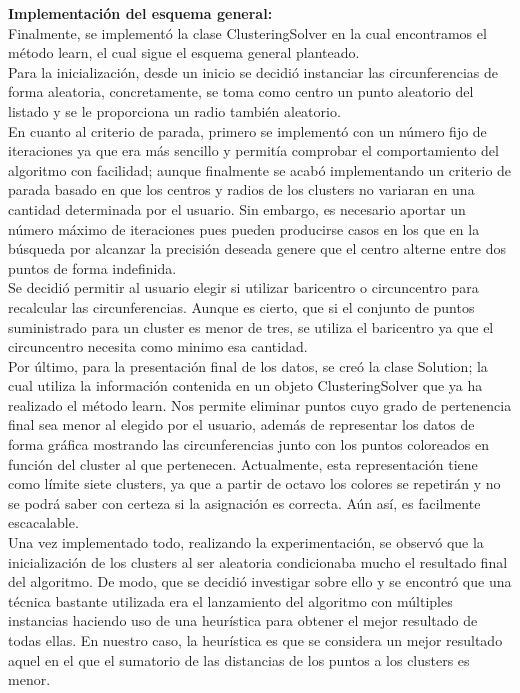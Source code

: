 \documentclass[conference,a4paper]{IEEEtran}
\begin{document}
\textbf{Implementación del esquema general:}\\

Finalmente, se implementó la clase ClusteringSolver en la cual encontramos el método learn, el cual sigue el esquema general planteado.\\
Para la inicialización, desde un inicio se decidió instanciar las circunferencias de forma aleatoria, concretamente, se toma como centro un punto aleatorio del listado y se le proporciona un radio también aleatorio.\\
En cuanto al criterio de parada, primero se implementó con un número fijo de iteraciones ya que era más sencillo y permitía comprobar el comportamiento del algoritmo con facilidad; aunque finalmente se acabó implementando un criterio de parada basado en que los centros y radios de los clusters no variaran en una cantidad determinada por el usuario. Sin embargo, es necesario aportar un número máximo de iteraciones pues pueden producirse casos en los que en la búsqueda por alcanzar la precisión deseada genere que el centro alterne entre dos puntos de forma indefinida.\\
Se decidió permitir al usuario elegir si utilizar baricentro o circuncentro para recalcular las circunferencias. Aunque es cierto, que si el conjunto de puntos suministrado para un cluster es menor de tres, se utiliza el baricentro ya que el circuncentro necesita como minimo esa cantidad.\\
Por último, para la presentación final de los datos, se creó la clase Solution; la cual utiliza la información contenida en un objeto ClusteringSolver que ya ha realizado el método learn. Nos permite eliminar puntos cuyo grado de pertenencia final sea menor al elegido por el usuario, además de representar los datos de forma gráfica mostrando las circunferencias junto con los puntos coloreados en función del cluster al que pertenecen. Actualmente, esta representación tiene como límite siete clusters, ya que a partir de octavo los colores se repetirán y no se podrá saber con certeza si la asignación es correcta. Aún así, es facilmente escacalable.\\
Una vez implementado todo, realizando la experimentación, se observó que la inicialización de los clusters al ser aleatoria condicionaba mucho el resultado final del algoritmo. De modo, que se decidió investigar sobre ello y se encontró que una técnica bastante utilizada era el lanzamiento del algoritmo con múltiples instancias  haciendo uso de una heurística para obtener el mejor resultado de todas ellas. En nuestro caso, la heurística es que se considera un mejor resultado aquel en el que el sumatorio de las distancias de los puntos a los clusters es menor.\\
\end{document}
